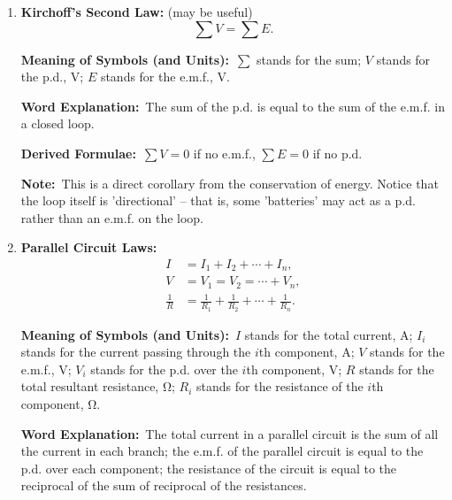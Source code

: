 \documentclass[8pt]{article}
\newcommand{\MeanSymb}{\textbf{Meaning of Symbols (and Units):}\ }
\newcommand{\WordExpl}{\textbf{Word Explanation:}\ }
\newcommand{\DeriForm}{\textbf{Derived Formulae:}\ }
\newcommand{\Note}{\textbf{Note:}\ }
\begin{document}
\begin{enumerate}
                \WordExpl The current flowing into a junction is equal to the current flowing out of a junction.

                \DeriForm The parallel circuit law (which will appear later).

                \Note This is a direct corollary from the conservation of charge.

                \item \textbf{Kirchoff's Second Law:} (may be useful)
                \[
                    \sum V = \sum E.
                \]

                \MeanSymb \(\sum\) stands for the sum; \(V\) stands for the p.d., \unit{\volt}; \(E\) stands for the e.m.f., \unit{\volt}.

                \WordExpl The sum of the p.d. is equal to the sum of the e.m.f. in a closed loop.

                \DeriForm \(\sum V = 0\) if no e.m.f., \(\sum E = 0\) if no p.d.

                \Note This is a direct corollary from the conservation of energy. Notice that the loop itself is 'directional' -- that is, some 'batteries' may act as a p.d. rather than an e.m.f. on the loop.

                \item \textbf{Parallel Circuit Laws:}
                \begin{align*}
                    I &= I_1 + I_2 + \cdots + I_n,\\
                    V &= V_1 = V_2 = \cdots + V_n,\\
                    \frac{1}{R} &= \frac{1}{R_1} + \frac{1}{R_2} + \cdots + \frac{1}{R_n}.
                \end{align*}

                \MeanSymb \(I\) stands for the total current, \unit{\ampere}; \(I_i\) stands for the current passing through the \(i\)th component, \unit{\ampere}; \(V\) stands for the e.m.f., \unit{\volt}; \(V_i\) stands for the p.d. over the \(i\)th component, \unit{\volt}; \(R\) stands for the total resultant resistance, \unit{\ohm}; \(R_i\) stands for the resistance of the \(i\)th component, \unit{\ohm}.

                \WordExpl The total current in a parallel circuit is the sum of all the current in each branch; the e.m.f. of the parallel circuit is equal to the p.d. over each component; the resistance of the circuit is equal to the reciprocal of the sum of reciprocal of the resistances.


\end{enumerate}
\end{document}
